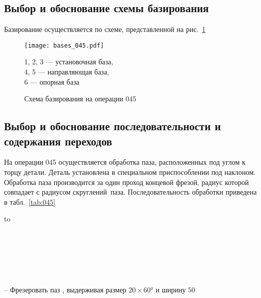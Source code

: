 \documentclass[14pt,russian,a4paper]{extreport}
\newcommand*\circled[1]{\tikz[baseline=(char.base)]{
             \node[shape=circle,draw,inner sep=2pt, minimum size=8mm] (char) {#1};}}
\begin{document}
\subsection{Выбор и обоснование схемы базирования}

Базирование осуществляется по схеме, представленной на рис.~\ref{fig:b045}

\begin{figure}[H]
	\centering
	   \texttt{[image: bases\_045.pdf]}
	   \caption{Схема базирования на операции 045}
	   \label{fig:b045}
	   1, 2, 3 --- установочная база, \\
	   4, 5 --- направляющая база, \\
	   6 --- опорная база
\end{figure}

\subsection{Выбор и обоснование последовательности и содержания переходов}

На операции 045 осуществляется обработка паза, расположенных под углом к торцу детали. Деталь установлена в специальном приспособлении под наклоном. Обработка паза производится за один проход концевой фрезой, радиус которой совпадает с радиусом скруглений паза. Последовательность обработки приведена в табл.~\ref{tab:045}

\begin{table}[H]
  \setlength{\tabulinesep}{1.2ex}
  \begin{longtabu} to \textwidth { | X[7,l,p] | }
    \caption{Содержание основных переходов операции 045} \label{tab:045} \\
  
      \hline 
       \\ \hline 
    \endfirsthead
  
       \\ \hline 
       \\ \hline
    \endhead
  
      \hline
    \endfoot

      -- Фрезеровать паз \circled{34}, выдерживая размер $20 \times \ang{60}$ и ширину $50$ \\ \hline

  \end{longtabu}
\end{table}
\end{document}
